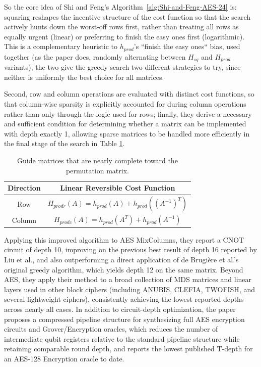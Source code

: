 So the core idea of Shi and Feng's Algorithm~\ref{alg:Shi-and-Feng-AES-24} is: squaring reshapes the incentive structure of the cost function so that the search actively hunts down the worst-off rows first, rather than treating all rows as equally urgent (linear) or preferring to finish the easy ones first (logarithmic). This is a complementary heuristic to $h_{prod}$'s ``finish the easy ones`` bias, used together (as the paper does, randomly alternating between $H_{sq}$ and $H_{prod}$ variants), the two give the greedy search two different strategies to try, since neither is uniformly the best choice for all matrices.

Second, row and column operations are evaluated with distinct cost functions, 
so that column-wise sparsity is explicitly accounted for during 
column operations rather than only through the logic used for 
rows; finally, they derive a necessary and sufficient condition 
for determining whether a matrix can be implemented with depth 
exactly 1, allowing sparse matrices to be handled more efficiently 
in the final stage of the search in Table \ref{tab:product-hamming-weight}.

\begin{table}[htbp]
\centering
\begin{tabular}{c|c}
\hline
Direction  & Linear Reversible Cost Function\\
\hline
Row & $H_{prodr}(A) = h_{prod}(A) + h_{prod}((A^{-1})^{T})$ \\ 
\hline
Column & $H_{prodc}(A) = h_{prod}(A^{T}) + h_{prod}(A^{-1})$ \\ 
\hline
\end{tabular}
	\caption{Guide matrices that are nearly complete toward the permutation matrix.}
	\label{tab:product-hamming-weight}
\end{table}

Applying this improved algorithm to AES MixColumns, they report a CNOT circuit of depth 10, improving on the previous best result of depth 16 reported by Liu et al.\cite{cryptoeprint:2023/1417}, and also outperforming a direct application of de Brugière et al.'s original greedy algorithm, which yields depth 12 on the same matrix. Beyond AES, they apply their method to a broad collection of MDS matrices and linear layers used in other block ciphers (including ANUBIS\cite{barreto2000anubis}, CLEFIA\cite{shirai2007128}, TWOFISH\cite{schneier1998twofish}, and several lightweight ciphers), consistently achieving the lowest reported depths across nearly all cases. In addition to circuit-depth optimization, the paper proposes a compressed pipeline structure for synthesizing full AES encryption circuits and Grover/Encryption oracles, which reduces the number of intermediate qubit registers relative to the standard pipeline structure while retaining comparable round depth, and reports the lowest published T-depth for an AES-128 Encryption oracle to date.

